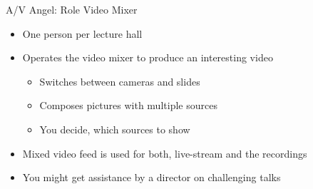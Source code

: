
\begin{frame}{A/V Angel: Role Video Mixer}
	\begin{itemize}
		\item One person per lecture hall
		\item Operates the video mixer to produce an interesting video
		\begin{itemize}
			\item Switches between cameras and slides
			\item Composes pictures with multiple sources
			\item You decide, which sources to show
		\end{itemize}
		\item Mixed video feed is used for both, live-stream and the recordings 
		\item You might get assistance by a director on challenging talks
	\end{itemize}
\end{frame}
